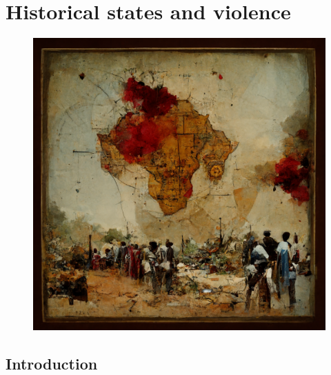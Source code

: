 \chapter{Historical states and violence}

\begin{figure}[hpbt]
	\centering
	\includegraphics[width=\textwidth]{img/oldmapcivilwarafrican.png}
\end{figure}

\clearpage



\section{Introduction} \label{Introduction}


